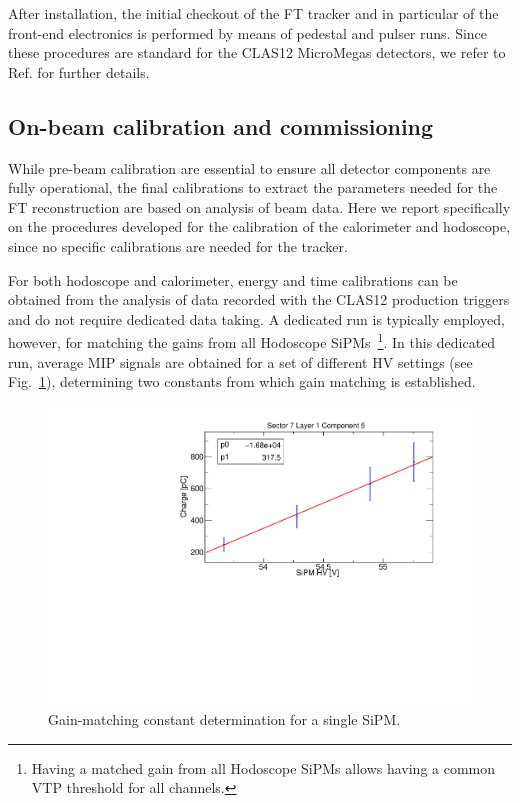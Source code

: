 After installation, the initial checkout of the FT tracker and in particular of the front-end electronics is performed by means of pedestal and pulser runs. Since these procedures are standard for the CLAS12 MicroMegas detectors, we refer to Ref. \cite{mm} for further details.

\subsection{On-beam calibration and commissioning}
While pre-beam calibration are essential to ensure all detector components are fully operational, the final calibrations to extract the parameters needed for the FT reconstruction are based on analysis of beam data. Here we report specifically on the procedures developed for the calibration of the calorimeter and hodoscope, since no specific calibrations are needed for the tracker.

For both hodoscope and calorimeter, energy and time calibrations can be obtained from the analysis of data recorded with the CLAS12 production triggers and do not require dedicated data taking. A dedicated run is typically employed, however, for matching the gains from all Hodoscope SiPMs~\footnote{Having a matched gain from all Hodoscope SiPMs allows having a common VTP threshold for all channels. }. In this dedicated run, average MIP signals are obtained for a set of different HV settings (see Fig.~\ref{fig:fthodo_gainmatch}), determining two constants from which gain matching is established.
\begin{figure}
\includegraphics[width=1.0\columnwidth]{fig/fthodo_gainmatch.pdf}
\caption{Gain-matching constant determination for a single SiPM.}
\label{fig:fthodo_gainmatch}
\end{figure}


